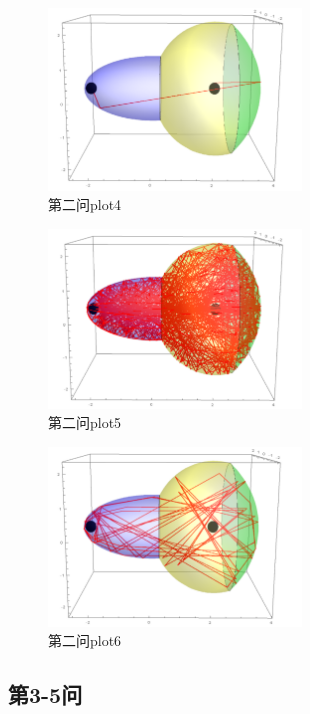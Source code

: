\documentclass[10pt, a4paper]{article}
\begin{document}
    \begin{figure}[H]
        \centering
        \includegraphics[width=0.6\textwidth]{q2_plot4.png}
        \caption{第二问plot4}\label{fig:第二问plot4}
    \end{figure}

    \begin{figure}[H]
        \centering
        \includegraphics[width=0.6\textwidth]{q2_plot5.png}
        \caption{第二问plot5}\label{fig:第二问plot5}
    \end{figure}

    \begin{figure}[H]
        \centering
        \includegraphics[width=0.6\textwidth]{q2_plot6.png}
        \caption{第二问plot6}\label{fig:第二问plot6}
    \end{figure}

    \subsection{第3-5问}
    
\end{document}
